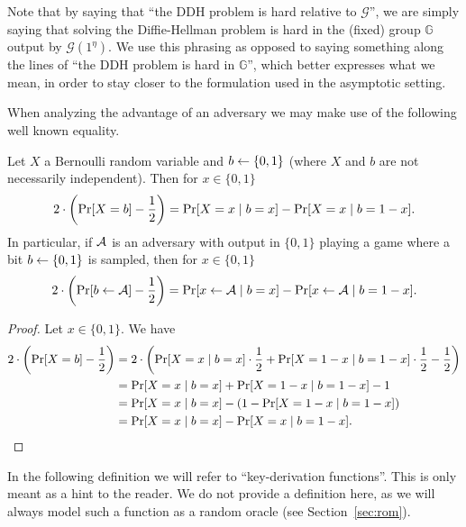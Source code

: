 Note that by saying that ``the DDH problem is hard relative to $\mathcal{G}$'', we are simply saying that solving the Diffie-Hellman problem is hard in the (fixed) group $\mathbb{G}$ output by $\mathcal{G}(1^\eta)$. We use this phrasing as opposed to saying something along the lines of ``the DDH problem is hard in $\mathbb{G}$'', which better expresses what we mean, in order to stay closer to the formulation used in the asymptotic setting.

When analyzing the advantage of an adversary we may make use of the following well known equality.

\begin{lemma}
	Let $X$ a Bernoulli random variable and $b \leftarrow \{0, 1\}$ (where $X$ and $b$ are not necessarily independent). Then for $x \in \{0, 1\}$
	\[
		2 \cdot \left(\pr{X = b} - \frac{1}{2}\right) = \pr{X = x \mid b = x} - \pr{X = x \mid b = 1 - x}.
	\]
	In particular, if $\mathcal{A}$ is an adversary with output in $\{0, 1\}$ playing a game where a bit $b \leftarrow \{0, 1\}$ is sampled, then for $x \in \{0, 1\}$
	\begin{equation} \label{eq:advantage-equality}
		2 \cdot \left(\pr{b \from \adv} - \frac{1}{2}\right) = \pr{x \from \adv \mid b = x} - \pr{x \from \adv \mid b = 1 - x}.
	\end{equation}
\end{lemma}
\begin{proof}
	Let $x \in \{0, 1\}$. We have
	\begin{align*}
		2 \cdot \left(\pr{X = b} - \frac{1}{2}\right) & = 2 \cdot \left(\pr{X = x \mid b = x} \cdot \frac{1}{2} + \pr{X = 1 - x \mid b = 1 - x} \cdot \frac{1}{2} - \frac{1}{2}\right) \\
		                                              & = \pr{X = x \mid b = x} + \pr{X = 1 - x \mid b = 1 - x} - 1                                                                    \\
		                                              & = \pr{X = x \mid b = x} - (1 - \pr{X = 1 - x \mid b = 1 - x})                                                                  \\
		                                              & = \pr{X = x \mid b = x} - \pr{X = x \mid b = 1 - x}.
	\end{align*}
\end{proof}

In the following definition we will refer to ``key-derivation functions''. This is only meant as a hint to the reader. We do not provide a definition here, as we will always model such a function as a random oracle (see Section~\vref{sec:rom}). 

